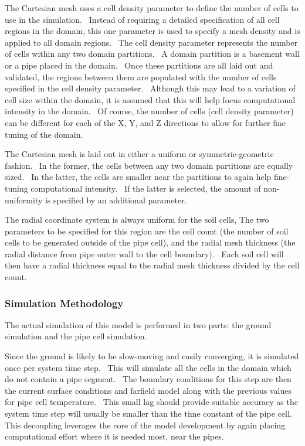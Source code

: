 The Cartesian mesh uses a cell density parameter to define the number of cells to use in the simulation.~ Instead of requiring a detailed specification of all cell regions in the domain, this one parameter is used to specify a mesh density and is applied to all domain regions.~ The cell density parameter represents the number of cells within any two domain partitions.~ A domain partition is a basement wall or a pipe placed in the domain.~ Once these partitions are all laid out and validated, the regions between them are populated with the number of cells specified in the cell density parameter.~ Although this may lead to a variation of cell size within the domain, it is assumed that this will help focus computational intensity in the domain. ~Of course, the number of cells (cell density parameter) can be different for each of the X, Y, and Z directions to allow for further fine tuning of the domain.

The Cartesian mesh is laid out in either a uniform or symmetric-geometric fashion.~ In the former, the cells between any two domain partitions are equally sized.~ In the latter, the cells are smaller near the partitions to again help fine-tuning computational intensity.~ If the latter is selected, the amount of non-uniformity is specified by an additional parameter.

The radial coordinate system is always uniform for the soil cells, The two parameters to be specified for this region are the cell count (the number of soil cells to be generated outside of the pipe cell), and the radial mesh thickness (the radial distance from pipe outer wall to the cell boundary).~ Each soil cell will then have a radial thickness equal to the radial mesh thickness divided by the cell count.

\subsubsection{Simulation Methodology}\label{simulation-methodology-001}

The actual simulation of this model is performed in two parts: the ground simulation and the pipe cell simulation.

Since the ground is likely to be slow-moving and easily converging, it is simulated once per system time step.~ This will simulate all the cells in the domain which do not contain a pipe segment.~ The boundary conditions for this step are then the current surface conditions and farfield model along with the previous values for pipe cell temperature.~ This small lag should provide suitable accuracy as the system time step will usually be smaller than the time constant of the pipe cell.~ This decoupling leverages the core of the model development by again placing computational effort where it is needed most, near the pipes.

